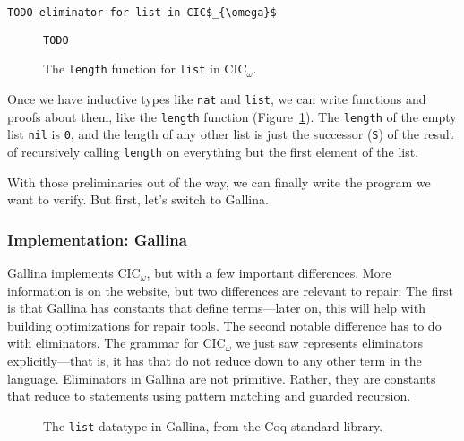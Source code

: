 \begin{lstlisting}
TODO eliminator for list in CIC$_{\omega}$
\end{lstlisting}

\begin{figure}
\begin{lstlisting}
TODO
\end{lstlisting}
\caption{The \lstinline{length} function for \lstinline{list} in CIC$_{\omega}$.}
\label{fig:length-theory}
\end{figure}

Once we have inductive types like \lstinline{nat} and \lstinline{list}, we can write functions and proofs about them, like the \lstinline{length} function (Figure~\ref{fig:length-theory}).
The \lstinline{length} of the empty list \lstinline{nil} is \lstinline{0}, and the length of any other list
is just the successor (\lstinline{S}) of the result of recursively calling \lstinline{length} on everything but the first element of the list.

With those preliminaries out of the way, we can finally write the program we want to verify.
But first, let's switch to Gallina.

\subsubsection{Implementation: Gallina}
\label{sec:gallina}

Gallina implements CIC$_{\omega}$, but with a few important differences.
More information is on the website, %
but two differences are relevant to repair:
The first is that Gallina has constants that define terms---later on, this will help with building optimizations for repair tools.
The second notable difference has to do with eliminators.
The grammar for CIC$_{\omega}$ we just saw represents eliminators explicitly---that is, it has  that do
not reduce down to any other term in the language.
Eliminators in Gallina are not primitive.
Rather, they are constants that reduce to statements using pattern matching and guarded recursion.

\begin{figure}
   
\caption{The \lstinline{list} datatype in Gallina, from the Coq standard library.}
\label{fig:list}
\end{figure}

